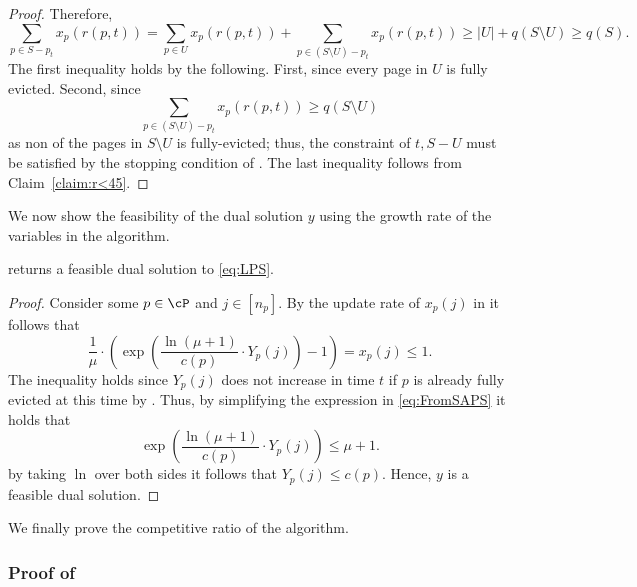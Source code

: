 \begin{proof}
	Therefore, 
	$$\sum_{p \in S-p_t} x_p(r(p,t)) = \sum_{p \in U} x_p(r(p,t))+\sum_{p \in (S\setminus U)-p_t} x_p(r(p,t)) \geq |U|+q(S \setminus U) \geq q(S).$$
	The first inequality holds by the following. First, since every page in $U$ is fully evicted. Second, since $$\sum_{p \in (S\setminus U)-p_t} x_p(r(p,t)) \geq q(S \setminus U)$$ as non of the pages in $S \setminus U$ is fully-evicted; thus, the constraint of $t,S-U$ must be satisfied by the stopping condition of .  The last inequality follows from Claim~\ref{claim:r<45}. 
\end{proof}


We now show the feasibility of the dual solution $y$ using the growth rate of the variables in the algorithm. 
	\begin{lemma}
	\label{lem:FFeasibleS}
	 returns a feasible dual solution to \eqref{eq:LPS}. 
\end{lemma}

\begin{proof}
	Consider some $p \in \cP$ and $j \in [n_p]$. By the update rate of $x_p(j)$ in  it follows that 
	\begin{equation}
		\label{eq:FromSAPS}
		\frac{1}{\mu} \cdot \left(     \exp \left(  \frac{\ln (\mu+1)}{c(p)} \cdot Y_p(j)\right)-1\right) = x_p(j) \leq 1.
	\end{equation} 
	The inequality holds since $Y_p(j)$ does not increase in time $t$ if $p$ is already fully evicted at this time by . Thus, by simplifying the expression in \eqref{eq:FromSAPS} it holds that 
	$$\exp \left( \frac{\ln (\mu+1)}{c(p)} \cdot Y_p(j) \right) \leq \mu+1.$$
	by taking $\ln$ over both sides it follows that $Y_p(j) \leq c(p)$. Hence, $y$ is a feasible dual solution. 
\end{proof}

We finally prove the competitive ratio of the algorithm.


\subsubsection*{Proof of }

